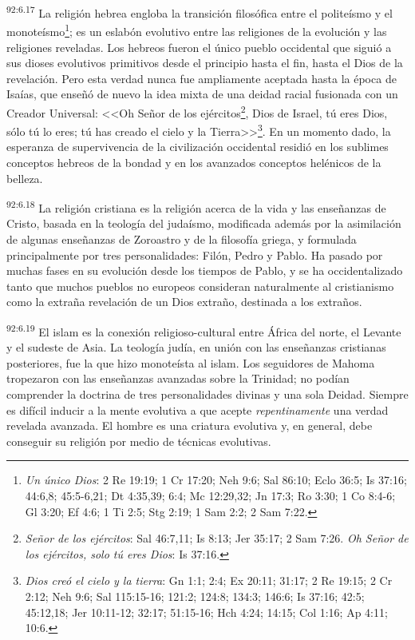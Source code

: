 \par
\textsuperscript{92:6.17} La religión hebrea engloba la transición filosófica entre el politeísmo y el monoteísmo\footnote{\textit{Un único Dios}: 2 Re 19:19; 1 Cr 17:20; Neh 9:6; Sal 86:10; Eclo 36:5; Is 37:16; 44:6,8; 45:5-6,21; Dt 4:35,39; 6:4; Mc 12:29,32; Jn 17:3; Ro 3:30; 1 Co 8:4-6; Gl 3:20; Ef 4:6; 1 Ti 2:5; Stg 2:19; 1 Sam 2:2; 2 Sam 7:22.}; es un eslabón evolutivo entre las religiones de la evolución y las religiones reveladas. Los hebreos fueron el único pueblo occidental que siguió a sus dioses evolutivos primitivos desde el principio hasta el fin, hasta el Dios de la revelación. Pero esta verdad nunca fue ampliamente aceptada hasta la época de Isaías, que enseñó de nuevo la idea mixta de una deidad racial fusionada con un Creador Universal: <<Oh Señor de los ejércitos\footnote{\textit{Señor de los ejércitos}: Sal 46:7,11; Is 8:13; Jer 35:17; 2 Sam 7:26. \textit{Oh Señor de los ejércitos, solo tú eres Dios}: Is 37:16.}, Dios de Israel, tú eres Dios, sólo tú lo eres; tú has creado el cielo y la Tierra>>\footnote{\textit{Dios creó el cielo y la tierra}: Gn 1:1; 2:4; Ex 20:11; 31:17; 2 Re 19:15; 2 Cr 2:12; Neh 9:6; Sal 115:15-16; 121:2; 124:8; 134:3; 146:6; Is 37:16; 42:5; 45:12,18; Jer 10:11-12; 32:17; 51:15-16; Hch 4:24; 14:15; Col 1:16; Ap 4:11; 10:6.}. En un momento dado, la esperanza de supervivencia de la civilización occidental residió en los sublimes conceptos hebreos de la bondad y en los avanzados conceptos helénicos de la belleza.

\par
\textsuperscript{92:6.18} La religión cristiana es la religión acerca de la vida y las enseñanzas de Cristo, basada en la teología del judaísmo, modificada además por la asimilación de algunas enseñanzas de Zoroastro y de la filosofía griega, y formulada principalmente por tres personalidades: Filón, Pedro y Pablo. Ha pasado por muchas fases en su evolución desde los tiempos de Pablo, y se ha occidentalizado tanto que muchos pueblos no europeos consideran naturalmente al cristianismo como la extraña revelación de un Dios extraño, destinada a los extraños.

\par
\textsuperscript{92:6.19} El islam es la conexión religioso-cultural entre África del norte, el Levante y el sudeste de Asia. La teología judía, en unión con las enseñanzas cristianas posteriores, fue la que hizo monoteísta al islam. Los seguidores de Mahoma tropezaron con las enseñanzas avanzadas sobre la Trinidad; no podían comprender la doctrina de tres personalidades divinas y una sola Deidad. Siempre es difícil inducir a la mente evolutiva a que acepte \textit{repentinamente} una verdad revelada avanzada. El hombre es una criatura evolutiva y, en general, debe conseguir su religión por medio de técnicas evolutivas.

